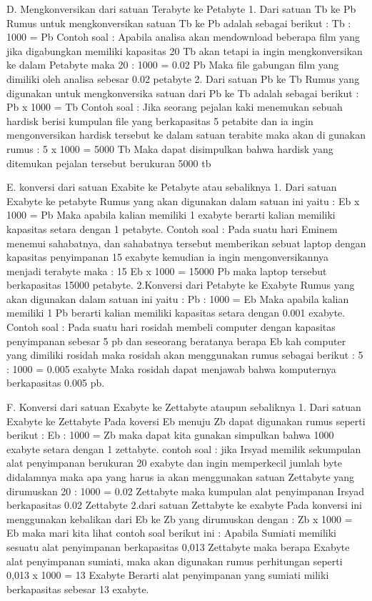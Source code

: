 D. Mengkonversikan dari satuan Terabyte ke Petabyte
1.	Dari satuan Tb ke Pb
Rumus untuk mengkonversikan satuan Tb ke Pb adalah sebagai berikut :
Tb : 1000 = Pb
Contoh soal :
Apabila analisa akan mendownload beberapa film yang jika digabungkan memiliki kapasitas 20 Tb akan tetapi ia ingin mengkonversikan ke dalam Petabyte maka 
20 : 1000 = 0.02 Pb
Maka file gabungan film yang dimiliki oleh analisa sebesar 0.02 petabyte
2. Dari satuan Pb ke Tb
Rumus yang digunakan untuk mengkonversika satuan dari Pb ke Tb adalah sebagai berikut :
Pb x 1000 = Tb
Contoh soal :
Jika seorang pejalan kaki menemukan sebuah hardisk berisi kumpulan file yang berkapasitas 5 petabite dan ia ingin mengonversikan hardisk tersebut ke dalam satuan terabite maka akan di gunakan rumus :
5 x 1000 = 5000 Tb
Maka dapat disimpulkan bahwa hardisk yang ditemukan pejalan tersebut berukuran 5000 tb

E. konversi dari satuan Exabite ke Petabyte atau sebaliknya
1. Dari satuan Exabyte ke petabyte
Rumus yang akan digunakan dalam satuan ini yaitu :
Eb x 1000 = Pb
Maka apabila kalian memiliki 1 exabyte berarti kalian memiliki kapasitas setara dengan 1 petabyte.
Contoh soal :
Pada suatu hari Eminem menemui sahabatnya, dan sahabatnya tersebut memberikan sebuat laptop dengan kapasitas penyimpanan 15 exabyte kemudian ia ingin mengonversikannya menjadi terabyte maka :
15 Eb x 1000 = 15000 Pb maka laptop tersebut berkapasitas 15000 petabyte.
2.Konversi dari Petabyte ke Exabyte
Rumus yang akan digunakan dalam satuan ini yaitu :
Pb : 1000 = Eb
Maka apabila kalian memiliki 1 Pb berarti kalian memiliki kapasitas setara dengan 0.001 exabyte.
Contoh soal :
Pada suatu hari rosidah membeli computer dengan kapasitas penyimpanan sebesar 5 pb dan seseorang beratanya berapa Eb kah computer yang dimiliki rosidah maka rosidah akan menggunakan rumus sebagai berikut :
5 : 1000 = 0.005 exabyte
Maka rosidah dapat menjawab bahwa komputernya berkapasitas 0.005 pb.

F. Konversi dari satuan Exabyte ke Zettabyte ataupun sebaliknya
1. Dari satuan Exabyte ke Zettabyte
Pada koversi Eb menuju Zb dapat digunakan rumus seperti berikut :
Eb : 1000 = Zb
maka dapat kita gunakan simpulkan bahwa 1000 exabyte setara dengan 1 zettabyte.
contoh soal :
jika Irsyad memilik sekumpulan alat penyimpanan berukuran 20 exabyte dan ingin memperkecil jumlah byte didalamnya maka apa yang harus ia akan menggunakan satuan Zettabyte yang dirumuskan
20 : 1000 = 0.02 Zettabyte
maka kumpulan alat penyimpanan Irsyad berkapasitas 0.02 Zettabyte
2.dari satuan Zettabyte ke exabyte
Pada konversi ini menggunakan kebalikan dari Eb ke Zb yang dirumuskan dengan :
Zb x 1000 = Eb
maka mari kita lihat contoh soal berikut ini :
Apabila Sumiati memiliki sesuatu alat penyimpanan berkapasitas 0,013 Zettabyte maka berapa Exabyte alat penyimpanan sumiati, maka akan digunakan rumus perhitungan seperti
0,013 x 1000 = 13 Exabyte
Berarti alat penyimpanan yang sumiati miliki berkapasitas sebesar 13 exabyte.


